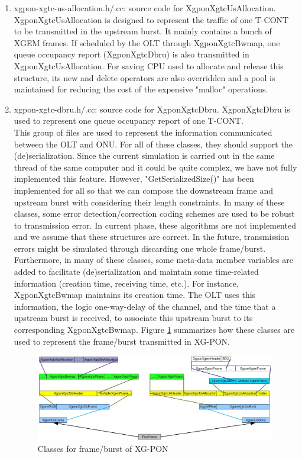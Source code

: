 \begin{enumerate}
 \item xgpon-xgtc-us-allocation.h/.cc: source code for {\color{red} XgponXgtcUsAllocation}. 
XgponXgtcUsAllocation is designed to represent the traffic of one T-CONT to be transmitted 
in the upstream burst. It mainly contains a bunch of XGEM frames. If scheduled by the OLT 
through XgponXgtcBwmap, one queue occupancy report (XgponXgtcDbru) is also transmitted in 
XgponXgtcUsAllocation. For saving CPU used to allocate and release this structure, 
its new and delete operators are also overridden and a pool is maintained for reducing 
the cost of the expensive "malloc" operations.

 \item xgpon-xgtc-dbru.h/.cc: source code for {\color{red} XgponXgtcDbru}. 
XgponXgtcDbru is used to represent one queue occupancy report of one T-CONT.
\\
{\color{blue} This group of files are used to represent the
information communicated between the OLT and ONU. For all of these
classes, they should support the (de)serialization. Since the
current simulation is carried out in the same thread of the same
computer and it could be quite complex, we have not fully
implemented this feature. However, "GetSerializedSize()" has been
implemented for all so that we can compose the downstream frame
and upstream burst with considering their length constraints. In
many of these classes, some error detection/correction coding
schemes are used to be robust to transmission error. In current
phase, these algorithms are not implemented and we assume that
these structures are correct. In the future, transmission errors
might be simulated through discarding one whole frame/burst.
Furthermore, in many of these classes, some meta-data member
variables are added to facilitate (de)serialization and maintain
some time-related information (creation time, receiving time,
etc.). For instance, XgponXgtcBwmap maintains its creation time.
The OLT uses this information, the logic one-way-delay of the
channel, and the time that a upstream burst is received, to
associate this upstream burst to its corresponding XgponXgtcBwmap.
Figure \ref{fig_xgpon_frame_files} summarizes how these classes
are used to represent the frame/burst transmitted in XG-PON. }

\begin{figure}[!htbp]
\begin{center}
\includegraphics[width=0.99\textwidth]{images/xgponframefiles}
\end{center}
\vspace{-0.1in}
\caption{Classes for frame/burst of XG-PON}
\label{fig_xgpon_frame_files}
\end{figure}


\end{enumerate}

